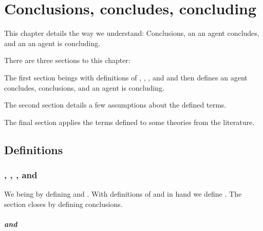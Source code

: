 \chapter{Conclusions, concludes, concluding}
\label{cha:clar}

\begin{note}
  This chapter details the way we understand: 
  Conclusions, an  an agent concludes, and an  an agent is concluding.
\end{note}


\begin{note}
  There are three sections to this chapter:

  The first section beings with definitions of , , , and  and then defines  an agent concludes, conclusions, and  an agent is concluding.

  The second section details a few assumptions about the defined terms.

  The final section applies the terms defined to some theories from the literature.
\end{note}



\section{Definitions}
\label{cha:clar:sec:Cons}


\subsection{, , , and }
\label{cha:clar:sec:Cons:pvp}

\begin{note}
  We being by defining  and .
  With definitions of  and  in hand we define .
  The section closes by defining conclusions.
\end{note}

\paragraph*{ and }

